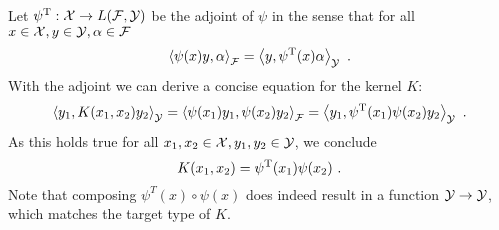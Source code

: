 Let $\psi^{\mathrm{T}}: \mathcal{X} \rightarrow L(\mathcal{F}, \mathcal{Y})$ be the adjoint of $\psi$ in the sense that for all $x \in \mathcal{X}, y\in \mathcal{Y}, \alpha \in \mathcal{F}$
\begin{equation}
 \left< \psi(x)y, \alpha\right>_{\mathcal{F}} = \left<y, \psi^{\mathrm{T}}(x) \alpha \right>_{\mathcal{Y}} \ .
\end{equation}
With the adjoint we can derive a concise equation for the kernel $K$:
\begin{align}
	\left< y_1, K(x_1, x_2) y_2\right>_{\mathcal{Y}} = \left< \psi(x_1) y_1, \psi(x_2) y_2\right>_{\mathcal{F}} = \left<y_1, \psi^{\mathrm{T}}(x_1)\psi(x_2) y_2\right>_{\mathcal{Y}} \ .
\end{align}
As this holds true for all $x_1, x_2 \in \mathcal{X}, y_1, y_2 \in \mathcal{Y}$, we conclude
\begin{equation}
\label{eq:kernel-feature-map}
K(x_1, x_2) = \psi^{\mathrm{T}}(x_1) \psi(x_2) \ .
\end{equation}
Note that composing $\psi^T(x) \circ \psi(x)$ does indeed result in a function $\mathcal{Y} \rightarrow \mathcal{Y}$, which matches the target type of $K$.

